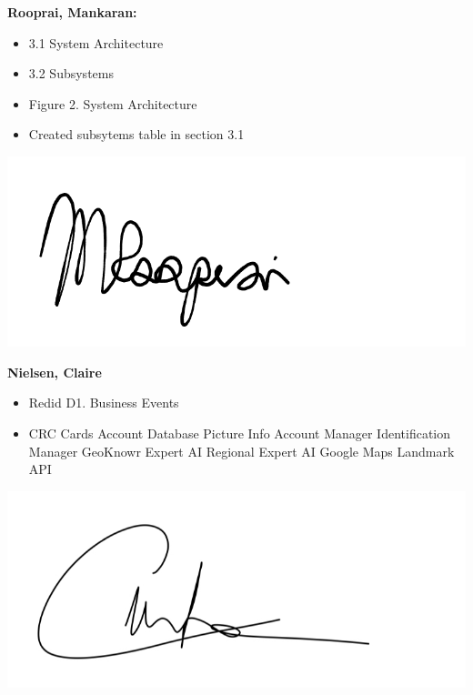 \documentclass[]{article}
\begin{document}
\textbf{Rooprai, Mankaran:}
\begin{itemize}
	\item 3.1 System Architecture
	\item 3.2 Subsystems
	\item Figure 2. System Architecture
	\item Created subsytems table in section 3.1
\end{itemize}
\includegraphics[scale=0.15]{mankaransignature.png}

\textbf{Nielsen, Claire}
\begin{itemize}
        \item Redid D1. Business Events
		\item CRC Cards
			\subitem Account Database
			\subitem Picture Info
			\subitem Account Manager
			\subitem Identification Manager
			\subitem GeoKnowr Expert AI
			\subitem Regional Expert AI
			\subitem Google Maps Landmark API
\end{itemize}
\includegraphics[scale=0.15]{clairesignature.jpg}
\end{document}
